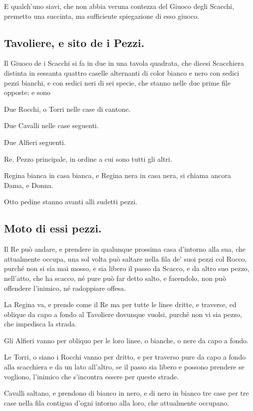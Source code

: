\documentclass[11pt,a6paper]{article}
\begin{document}
E qualch'uno siavi, che non abbia veruna
contezza del Giuoco degli Scacchi,
premetto una succinta, ma sufficiente
spiegazione di esso giuoco.

\subsection{Tavoliere, e sito de i Pezzi.}

Il Giuoco de i Scacchi si fa in due in una
tavola quadrata, che dicesi Scacchiera distinta
in sessanta quattro caselle alternanti di
color bianco e nero con sedici pezzi bianchi,
e con sedici neri di sei specie, che stanno nelle
due prime file opposte; e sono

Due Rocchi, o Torri nelle case di cantone.

Due Cavalli nelle case seguenti.

Due Alfieri seguenti.

Re. Pezzo principale, in ordine a cui sono tutti gli altri.

Regina bianca in casa bianca, e Regina
nera in casa nera, si chiama ancora Dama, e
Donna.

Otto pedine stanno avanti alli sudetti
pezzi.

\subsection{Moto di essi pezzi.}

Il Re può andare, e prendere in qualunque
prossima casa d'intorno alla sua, che
attualmente occupa, una sol volta può saltare
nella fila de' suoi pezzi col Rocco, purché
non si sia mai mosso, e sia libero il passo da
Scacco, e da altro suo pezzo, nell'atto, che
ha scacco, né pure può far detto salto, e
facendolo, non può offendere l'inimico, né radoppiare
offesa.

La Regina va, e prende come il Re ma
per tutte le linee dritte, e traverse, ed oblique
da capo a fondo al Tavoliere dovunque
vuolsi, purché non vi sia pezzo, che impedisca la strada.

Gli Alfieri vanno per obliquo per le loro
linee, o bianche, o nere da capo a fondo.

Le Torri, o siano i Rocchi vanno per
dritto, e per traverso pure da capo a fondo
alla scacchiera e da un lato all'altro, se il passo
sia libero e possono prendere se vogliono, l'inimico
che s'incontra essere per queste strade.

Cavalli saltano, e prendono di bianco
in nero, e di nero in bianco tre case per tre
case nella fila contigua d'ogni intorno alla
loro, che attualmente occupano.
\end{document}
